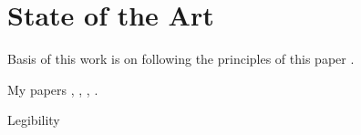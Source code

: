 \section{State of the Art}
\label{sec:soa}

Basis of this work is on following the principles of this paper \citep{gallotti2017alignment}.

My papers \citep{duarte2018action}, \citep{duarte2018actionalignment}, \citep{rakovic2018dataset}, \citep{rakovic2018gazedialogue}.

Legibility \citep{dragan2013legibility}